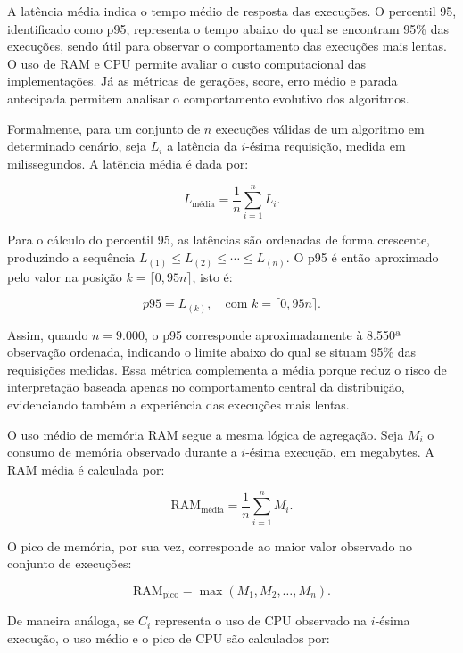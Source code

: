 A latência média indica o tempo médio de resposta das execuções. O percentil 95, identificado como p95, representa o tempo abaixo do qual se encontram 95\% das execuções, sendo útil para observar o comportamento das execuções mais lentas. O uso de RAM e CPU permite avaliar o custo computacional das implementações. Já as métricas de gerações, score, erro médio e parada antecipada permitem analisar o comportamento evolutivo dos algoritmos.

Formalmente, para um conjunto de \(n\) execuções válidas de um algoritmo em determinado cenário, seja \(L_i\) a latência da \(i\)-ésima requisição, medida em milissegundos. A latência média é dada por:

\begin{equation}
L_{\text{média}} = \frac{1}{n}\sum_{i=1}^{n} L_i.
\end{equation}

Para o cálculo do percentil 95, as latências são ordenadas de forma crescente, produzindo a sequência \(L_{(1)} \leq L_{(2)} \leq \cdots \leq L_{(n)}\). O p95 é então aproximado pelo valor na posição \(k = \lceil 0{,}95n \rceil\), isto é:

\begin{equation}
p95 = L_{(k)}, \quad \text{com } k = \lceil 0{,}95n \rceil.
\end{equation}

Assim, quando \(n = 9.000\), o p95 corresponde aproximadamente à 8.550ª observação ordenada, indicando o limite abaixo do qual se situam 95\% das requisições medidas. Essa métrica complementa a média porque reduz o risco de interpretação baseada apenas no comportamento central da distribuição, evidenciando também a experiência das execuções mais lentas.

O uso médio de memória RAM segue a mesma lógica de agregação. Seja \(M_i\) o consumo de memória observado durante a \(i\)-ésima execução, em megabytes. A RAM média é calculada por:

\begin{equation}
\text{RAM}_{\text{média}} = \frac{1}{n}\sum_{i=1}^{n} M_i.
\end{equation}

O pico de memória, por sua vez, corresponde ao maior valor observado no conjunto de execuções:

\begin{equation}
\text{RAM}_{\text{pico}} = \max(M_1, M_2, \ldots, M_n).
\end{equation}

De maneira análoga, se \(C_i\) representa o uso de CPU observado na \(i\)-ésima execução, o uso médio e o pico de CPU são calculados por:

